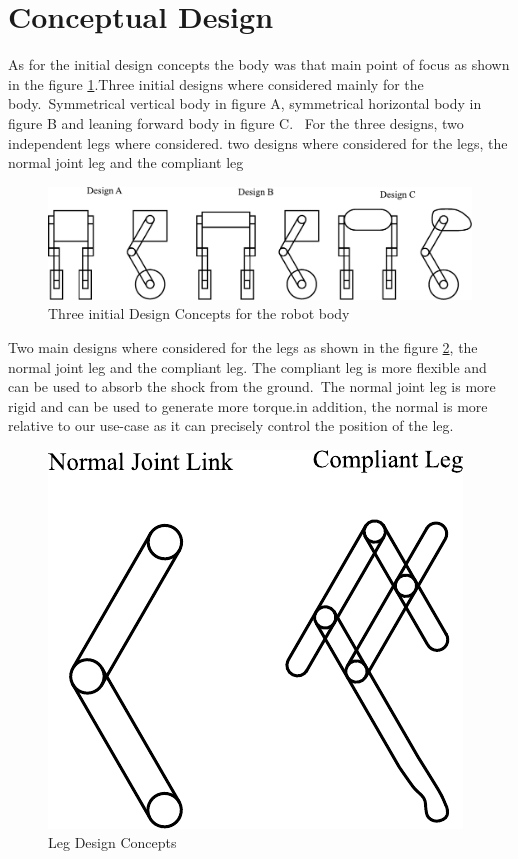 \section{Conceptual Design}
As for the initial design concepts the body was that main point of focus as shown in the figure \ref{fig:initialdesigns}.Three initial designs where considered mainly for the body.\ Symmetrical vertical body in figure A, symmetrical horizontal body in figure B and leaning forward body in figure C\@.
\ For the three designs, two independent legs where considered.
two designs where considered for the legs, the normal joint leg and the compliant leg

\begin{figure}[h]
	\centering
	\includegraphics[width=1\linewidth]{Conceptual Design}
	\caption[Initial Design Concepts]{Three initial Design Concepts for the robot body}
	\label{fig:initialdesigns}
\end{figure}
Two main designs where considered for the legs as shown in the figure \ref{fig:legdesignsjbhi}, the normal joint leg and the compliant leg.
The compliant leg is more flexible and can be used to absorb the shock from the ground.\ The normal joint leg is more rigid and can be used to generate more torque.in addition, the normal is more relative to our use-case as it can precisely control the position of the leg.
\begin{figure}[h]
	\centering
	\includegraphics[width=0.4\linewidth]{Leg Design}
	\caption[Leg Design Concepts]{Leg Design Concepts}
	\label{fig:legdesignsjbhi}
\end{figure}

